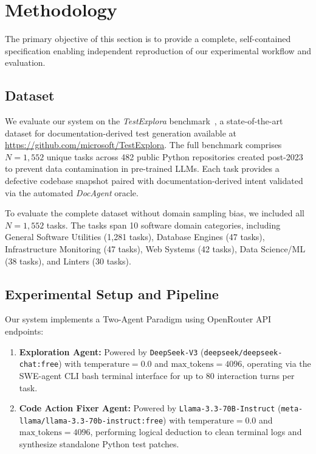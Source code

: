 \section{Methodology}
\label{sec:method}

The primary objective of this section is to provide a complete, self-contained specification enabling independent reproduction of our experimental workflow and evaluation.

\subsection{Dataset}
\label{subsec:dataset}
We evaluate our system on the \textit{TestExplora} benchmark~\cite{testexplora}, a state-of-the-art dataset for documentation-derived test generation available at \url{https://github.com/microsoft/TestExplora}. The full benchmark comprises $N=1,552$ unique tasks across 482 public Python repositories created post-2023 to prevent data contamination in pre-trained LLMs. Each task provides a defective codebase snapshot paired with documentation-derived intent validated via the automated \textit{DocAgent} oracle. 

To evaluate the complete dataset without domain sampling bias, we included all $N=1,552$ tasks. The tasks span 10 software domain categories, including General Software Utilities (1,281 tasks), Database Engines (47 tasks), Infrastructure Monitoring (47 tasks), Web Systems (42 tasks), Data Science/ML (38 tasks), and Linters (30 tasks).

\subsection{Experimental Setup and Pipeline}
\label{subsec:setup}
Our system implements a Two-Agent Paradigm using OpenRouter API endpoints:
\begin{enumerate}
    \item \textbf{Exploration Agent:} Powered by \texttt{DeepSeek-V3} (\texttt{deepseek/deepseek-chat:free}) with $\text{temperature}=0.0$ and $\text{max\_tokens}=4096$, operating via the SWE-agent CLI bash terminal interface for up to 80 interaction turns per task.
    \item \textbf{Code Action Fixer Agent:} Powered by \texttt{Llama-3.3-70B-Instruct} (\texttt{meta-llama/llama-3.3-70b-instruct:free}) with $\text{temperature}=0.0$ and $\text{max\_tokens}=4096$, performing logical deduction to clean terminal logs and synthesize standalone Python test patches.
\end{enumerate}

